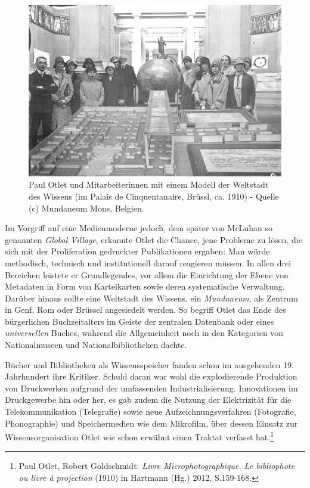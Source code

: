 \begin{figure}[htbp]
\centering
\includegraphics{img/Mundaneum2.png}
\caption*{Paul Otlet und Mitarbeiterinnen mit einem Modell der Weltstadt
des Wissens (im Palais de Cinquentanaire, Brüssl, ca. 1910) - Quelle (c)
Mundaneum Mons, Belgien.}
\end{figure}

Im Vorgriff auf eine Medienmoderne jedoch, dem später von McLuhan so
genannten \emph{Global Village}, erkannte Otlet die Chance, jene
Probleme zu lösen, die sich mit der Proliferation gedruckter
Publikationen ergaben: Man würde methodisch, technisch und
institutionell darauf reagieren müssen. In allen drei Bereichen leistete
er Grundlegendes, vor allem die Einrichtung der Ebene von Metadaten in
Form von Karteikarten sowie deren systematische Verwaltung. Darüber
hinaus sollte eine Weltstadt des Wissens, ein \emph{Mundaneum}, als
Zentrum in Genf, Rom oder Brüssel angesiedelt werden. So begriff Otlet
das Ende des bürgerlichen Buchzeitalters im Geiste der zentralen
Datenbank oder eines \emph{universellen} Buches, während die
Allgemeinheit noch in den Kategorien von Nationalmuseen und
Nationalbibliotheken dachte.

Bücher und Bibliotheken als Wissensspeicher fanden schon im ausgehenden
19. Jahrhundert ihre Kritiker. Schuld daran war wohl die explodierende
Produktion von Druckwerken aufgrund der umfassenden Industrialisierung.
Innovationen im Druckgewerbe hin oder her, es gab zudem die Nutzung der
Elektrizität für die Telekommunikation (Telegrafie) sowie neue
Aufzeichnungsverfahren (Fotografie, Phonographie) und Speichermedien wie
dem Mikrofilm, über dessen Einsatz zur Wissensorganisation Otlet wie
schon erwähnt einen Traktat verfasst hat.\footnote{Paul Otlet, Robert
  Goldschmidt: \emph{Livre Microphotographique. Le bibliophote ou livre
  à projection} (1910) in Hartmann (Hg.) 2012, S.159-168.}

